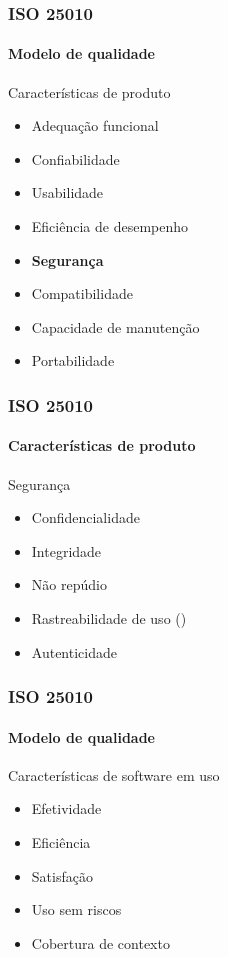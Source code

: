  
\begin{frame}
	\frametitle{ISO 25010}
	\framesubtitle{Modelo de qualidade}

	\begin{block:fact}{Características de produto}
		\begin{itemize}
			\item Adequação funcional
			\item Confiabilidade
			\item Usabilidade
			\item Eficiência de desempenho
			\item \textbf{Segurança}
			\item Compatibilidade
			\item Capacidade de manutenção
			\item Portabilidade
		\end{itemize}
	\end{block:fact}
	
\end{frame}


\begin{frame}
	\frametitle{ISO 25010}
	\framesubtitle{Características de produto}

	\begin{block:fact}{Segurança}
		\begin{itemize}
			\item Confidencialidade
			\item Integridade
			\item Não repúdio
			\item Rastreabilidade de uso ()
			\item Autenticidade
		\end{itemize}
	\end{block:fact}
\end{frame}


 
\begin{frame}
	\frametitle{ISO 25010}
	\framesubtitle{Modelo de qualidade}

	\begin{block:fact}{Características de software em uso}
		\begin{itemize}
			\item Efetividade
			\item Eficiência
			\item Satisfação
			\item Uso sem riscos
			\item Cobertura de contexto
		\end{itemize}
	\end{block:fact}
\end{frame}


